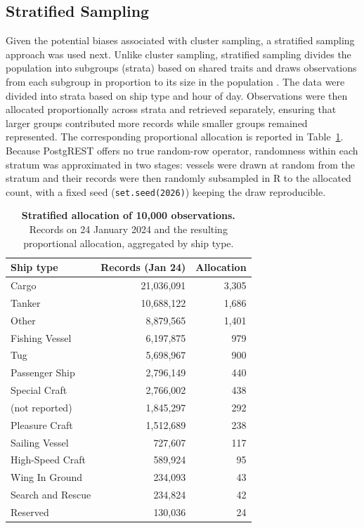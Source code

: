 \documentclass[10pt,a4paper]{article}
\begin{document}
\subsection{Stratified Sampling}

Given the potential biases associated with cluster sampling, a stratified sampling approach was used next.
Unlike cluster sampling, stratified sampling divides the population into subgroups (strata) based on shared
traits and draws observations from each subgroup in proportion to its size in the population \cite{8}. The data were
divided into strata based on ship type and hour of day. Observations were then allocated proportionally across
strata and retrieved separately, ensuring that larger groups contributed more records while smaller groups
remained represented. The corresponding proportional allocation is reported in
Table~\ref{tab:stratified-allocation}. Because PostgREST offers no true random-row
operator, randomness within each stratum was approximated in two stages: vessels were
drawn at random from the stratum and their records were then randomly subsampled in R
to the allocated count, with a fixed seed (\texttt{set.seed(2026)}) keeping the draw
reproducible.

\begin{table}[ht]
\caption{\textbf{Stratified allocation of 10,000 observations.} Records on 24 January 2024 and the resulting proportional allocation, aggregated by ship type.}
\label{tab:stratified-allocation}
\vspace{0.2cm}
\centering
\small
\begin{tabular}{@{}lrr@{}}
\toprule
{\bfseries Ship type} & {\bfseries Records (Jan 24)} & {\bfseries Allocation} \\
\midrule
Cargo             & 21,036,091 & 3,305 \\
Tanker            & 10,688,122 & 1,686 \\
Other             &  8,879,565 & 1,401 \\
Fishing Vessel    &  6,197,875 &   979 \\
Tug               &  5,698,967 &   900 \\
Passenger Ship    &  2,796,149 &   440 \\
Special Craft     &  2,766,002 &   438 \\
(not reported)    &  1,845,297 &   292 \\
Pleasure Craft    &  1,512,689 &   238 \\
Sailing Vessel    &    727,607 &   117 \\
High-Speed Craft  &    589,924 &    95 \\
Wing In Ground    &    234,093 &    43 \\
Search and Rescue &    234,824 &    42 \\
Reserved          &    130,036 &    24 \\
\bottomrule
\end{tabular}
\end{table}
\end{document}
